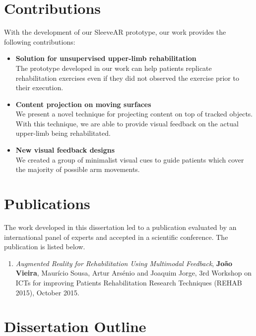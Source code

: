 \section{Contributions}

With the development of our SleeveAR prototype, our work provides the following contributions:

\begin{itemize}
\item \textbf{Solution for unsupervised upper-limb rehabilitation}\\
The prototype developed in our work can help patients replicate rehabilitation exercises even if they did not observed the exercise prior to their execution.

\item \textbf{Content projection on moving surfaces}\\
We present a novel technique for projecting content on top of tracked objects. With this technique, we are able to provide visual feedback on the actual upper-limb being rehabilitated.

\item \textbf{New visual feedback designs}\\
We created a group of minimalist visual cues to guide patients which cover the majority of possible arm movements.

\end{itemize}
 

\section{Publications}


The work developed in this dissertation led to a publication evaluated by an international panel of experts and accepted in a scientific conference. The publication is listed below.

\begin{enumerate}
\item \textit{Augmented Reality for Rehabilitation Using Multimodal Feedback}, \textbf{Jo\~{a}o Vieira}, Maur\'icio Sousa, Artur Ars\'enio and Joaquim Jorge, 3rd Workshop on ICTs for improving Patients Rehabilitation Research Techniques (REHAB 2015), October 2015.
\end{enumerate}


\section{Dissertation Outline}

